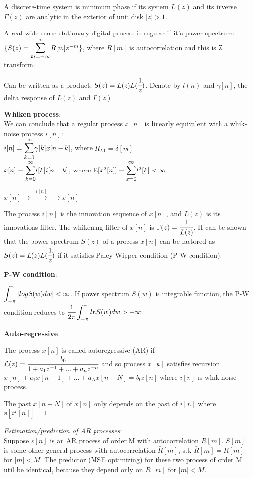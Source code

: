 \documentclass[12pt,a4paper]{article}
\begin{document}
A discrete-time system is minimum phase if its system $L(z)$ and its inverse $\Gamma(z)$ are analytic in the exterior of unit disk $|z|>1$. 

A real wide-sense stationary digital process is regular if it's power spectrum:\\
$\{S(z)=\bsum{m=-\infty}{\infty} R[m]z^{-m}\}$, where $R[m]$ is autocorrelation and this is Z transform. 

Can be written as a product: $S(z)=L(z)L(\cfrac{1}{z})$. 
Denote by $l(n)$ and $\gamma[n]$, the delta response of $L(z)$ and $\Gamma(z)$. 

\vspace{0.5cm}
\textbf{Whiken process}:\\
We can conclude that a regular process $x[n]$ is linearly equivalent with a whik-noise process $i[n]$:\\
$i[n]=\bsum{k=0}{\infty}\gamma[k]x[n-k]$, where $R_{L1}=\delta[m]$\\
$x[n]=\bsum{k=0}{\infty}l[k]i[n-k]$, where $\ee[x^2[n]]=\bsum{k=0}{\infty}l^2[k]<\infty$

$x[n] \longrightarrow $ $\overset{i[n]}{\longrightarrow}$  $\longrightarrow x[n]$

The process $i[n]$ is the innovation sequence of $x[n]$, and $L(z)$ is its innovations filter. 
The whikening filter of $x[n]$ is $\Gamma(z)=\cfrac{1}{L(z)}$. H can be shown that the power spectrum $S(z)$ of a process $x[n]$ can be factored as $S(z)=L(z)L(\cfrac{1}{z})$ if it satisfies Paley-Wipper condition (P-W condition).

\vspace{0.5cm}
\textbf{P-W condition}:

$\bint{-\pi}{\pi}|logS(w)dw|< \infty$. If power spectrum $S(w)$ is integrable function, the P-W condition reduces to $\cfrac{1}{2\pi}\bint{-\pi}{\pi} lnS(w)dw>-\infty$

\vspace{0.5cm}
\textbf{Auto-regressive}

The process $x[n]$ is called autoregressive (AR) if $\mathcal{L}(z)=\cfrac{b_0}{1+a_1z^{-1}+...+a_nz^{-n}}$ and so process $x[n]$ satisfies recursion \\
$x[n]+a_1x[n-1]+...+a_Nx[n-N]=b_0i[n]$ where $i[n]$ is whik-noise process. 

The past $x[n-N]$ of $x[n]$ only depends on the past of $i[n]$ where $\ee[i^2[n]]=1$

\textit{Estimation/prediction of AR processes}: \\
Suppose $s[n]$ is an AR process of order M with autocorrelation $R[m]$. $\bar{S}[m]$ is some other general process with autocorrelation $\bar{R}[m]$, s.t. $\bar{R}[m]=R[m]$ for $|m|<M$. 
The predictor (MSE optimizing) for these two process of order M util be identical, because they depend only on $R[m]$ for $|m|<M$.
\end{document}
